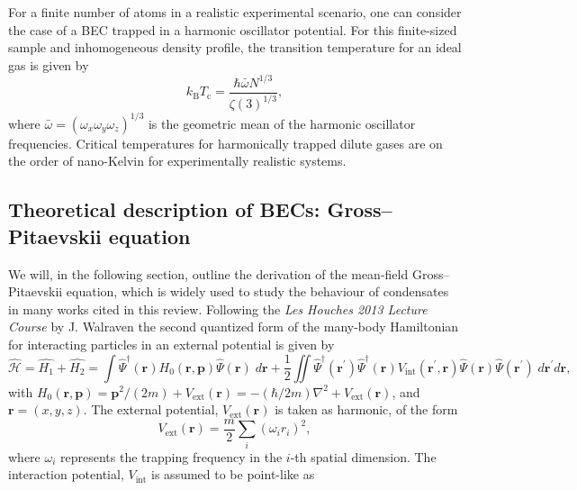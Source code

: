 For a finite number of atoms in a realistic experimental scenario, one can consider the case of a BEC trapped in a harmonic oscillator potential. For this finite-sized sample and inhomogeneous density profile, the transition temperature for an ideal gas is given by~\cite{BK:Pitaevskii_Stringari_2003}
\begin{equation}
k_{\textrm{B}}T_{\textrm{c}} = \frac{\hbar\bar{\omega}N^{1/3}}{\zeta(3)^{1/3}},
\end{equation}
where $\bar{\omega}=(\omega_x\omega_y\omega_z)^{1/3}$ is the geometric mean of the harmonic oscillator frequencies. Critical temperatures for harmonically trapped dilute gases are on the order of nano-Kelvin for experimentally realistic systems.

\subsection{Theoretical description of BECs: Gross--Pitaevskii equation}\label{sub:gpederiv}
We will, in the following section, outline the derivation of the mean-field Gross--Pitaevskii equation, which is widely used to study the behaviour of condensates in many works cited in this review. Following the \textit{Les Houches 2013 Lecture Course} by J. Walraven \cite{LEC:Walraven_lh_2013} the second quantized form of the many-body Hamiltonian for interacting particles in an external potential is given by
\begin{equation}\label{eqn:ham2ndq}
\hat{\mathcal{H}} = \hat{H_1} + \hat{H_2} = \int \hat{\Psi}^{\dagger}(\mathbf{r}) H_0\left(\textbf{r},\textbf{p} \right)  \hat{\Psi}(\mathbf{r}) \; d\textbf{r}  + \frac{1}{2} \iint\hat{\Psi}^{\dagger}(\mathbf{r}^\prime)\hat{\Psi}^{\dagger}(\mathbf{r})V_{\textrm{int}}(\textbf{r}^\prime,\textbf{r})\hat{\Psi}(\mathbf{r})\hat{\Psi}(\mathbf{r}^\prime) \; d\textbf{r}^\prime d\textbf{r},
\end{equation}
with $H_0\left(\mathbf{r}, \mathbf{p} \right) = \mathbf{p}^2/({2m}) + V_{\textrm{ext}}\left(\mathbf{r}\right) = -({\hbar/2m})\nabla^2 + V_{\textrm{ext}}\left(\mathbf{r}\right)$, and $\mathbf{r} = (x,y,z)$. The external potential, $V_{\text{ext}}(\mathbf{r})$ is taken as harmonic, of the form
\begin{equation}
V_{\text{ext}}(\mathbf{r}) = \frac{m}{2}\displaystyle\sum_{i}{\left(\omega_i r_i \right)^2},\end{equation}
where $\omega_i$ represents the trapping frequency in the $i$-th spatial dimension. The interaction potential, $V_{\text{int}}$ is assumed to be point-like as
